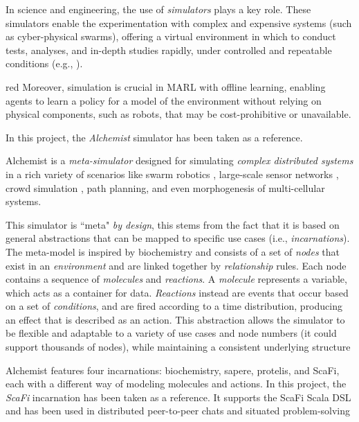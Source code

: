 \documentclass[12pt,a4paper,openright,twoside]{book}
\begin{document}
In science and engineering, the use of \emph{simulators} plays a key role. These simulators enable the experimentation 
    with complex and expensive systems (such as cyber-physical swarms), offering a virtual 
    environment in which to conduct tests, analyses, and in-depth studies rapidly, under controlled and 
    repeatable conditions (e.g., \cite{argun2021simulation, bagrodia1998parsec, choi2021use, cannon2009simulation}).
    \begin{color}{red}
    Moreover, simulation is crucial in MARL with offline learning, enabling agents to learn a policy 
    for a model of the environment without relying on physical components, such as robots, 
    that may be cost-prohibitive or unavailable.
    \end{color}
    In this project, the \emph{Alchemist} \cite{alchemist} simulator has been taken as a reference.

Alchemist is a \emph{meta-simulator} designed for simulating \emph{complex distributed systems} in a rich variety of scenarios 
    like swarm robotics \cite{Casadei2021}, large-scale sensor networks \cite{Aguzzi_2022},
    crowd simulation \cite{AC}, path planning, and even morphogenesis of multi-cellular systems.

This simulator is ``meta" \emph{by design}, this stems from the fact that it is based on general abstractions that
    can be mapped to specific use cases (i.e., \emph{incarnations}). The meta-model is inspired by biochemistry
    and consists of a set of \emph{nodes} that exist in an \emph{environment} and are linked together by 
    \emph{relationship} rules.
    Each node contains a sequence of \emph{molecules} and \emph{reactions}. 
    A \emph{molecule} represents a variable, which acts as a container for data. 
    \emph{Reactions} instead are events that occur based on a set of \emph{conditions}, and are fired according 
    to a time distribution, producing an effect that is described as an action. 
    This abstraction allows the simulator to be flexible and adaptable to a variety of use cases and node
    numbers (it could support thousands of nodes), while maintaining a consistent underlying structure

Alchemist features four incarnations: biochemistry, sapere, protelis, and ScaFi, 
    each with a different way of modeling molecules and actions.
    In this project, the \emph{ScaFi} incarnation has been taken as a reference.
    It supports the ScaFi Scala DSL and has been used in distributed peer-to-peer chats and 
    situated problem-solving
\end{document}
